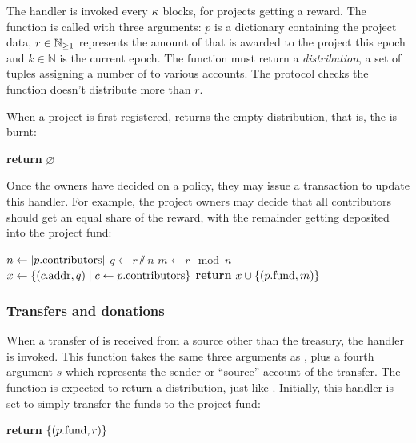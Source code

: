 The  handler is invoked every $\kappa$ blocks, for
projects getting a reward. The function is called with three arguments: $p$ is
a dictionary containing the project data, $r \in \mathbb{N}_{\geq 1}$ represents the amount
of \oscoin{} that is awarded to the project this epoch and $k \in \mathbb{N}$ is the
current epoch. The function must return a \emph{distribution}, a set of tuples
assigning a number of \oscoin{} to various accounts. The protocol checks the
function doesn't distribute more than $r$.

When a project is first registered,  returns the empty
distribution, that is, the \oscoin{} is burnt:
\begin{algorithmic}[0]
        \State \textbf{return} $\varnothing$
    \EndProcedure
\end{algorithmic}

Once the owners have decided on a policy, they may issue a transaction to update
this handler. For example, the project owners may decide that all contributors
should get an equal share of the reward, with the remainder getting deposited
into the project fund:

\begin{algorithmic}[0]
        \State $n \gets |p.{\mathrm{contributors}}|$
        \State $q \gets r \sslash n$
        \State $m \gets r \mod n$
        \State $x \gets \{ (c.{\mathrm{addr}}, q) \mid c \gets p.{\mathrm{contributors}} \}$
        \State \textbf{return} $x \cup \{ (p.{\mathrm{fund}}, m) \}$
    \EndProcedure
\end{algorithmic}

\subsubsection{Transfers and donations}

When a transfer of \oscoin{} is received from a source other than the treasury,
the  handler is invoked. This function takes the same
three arguments as , plus a fourth argument $s$ which
represents the sender or ``source'' account of the transfer. The function is
expected to return a distribution, just like . Initially,
this handler is set to simply transfer the funds to the project fund:
\medskip
\begin{algorithmic}[0]
        \State \textbf{return} $\{ (p.{\mathrm{fund}}, r) \}$
    \EndProcedure
\end{algorithmic}

